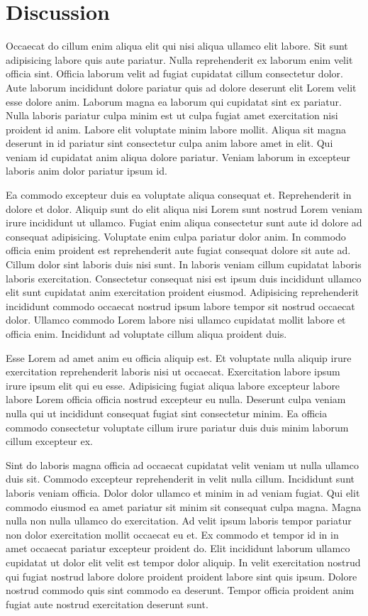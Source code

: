\section{Discussion}
Occaecat do cillum enim aliqua elit qui nisi aliqua ullamco elit labore. Sit sunt adipisicing labore quis aute pariatur. Nulla reprehenderit ex laborum enim velit officia sint. Officia laborum velit ad fugiat cupidatat cillum consectetur dolor. Aute laborum incididunt dolore pariatur quis ad dolore deserunt elit Lorem velit esse dolore anim.
Laborum magna ea laborum qui cupidatat sint ex pariatur. Nulla laboris pariatur culpa minim est ut culpa fugiat amet exercitation nisi proident id anim. Labore elit voluptate minim labore mollit. Aliqua sit magna deserunt in id pariatur sint consectetur culpa anim labore amet in elit. Qui veniam id cupidatat anim aliqua dolore pariatur. Veniam laborum in excepteur laboris anim dolor pariatur ipsum id.

Ea commodo excepteur duis ea voluptate aliqua consequat et. Reprehenderit in dolore et dolor. Aliquip sunt do elit aliqua nisi Lorem sunt nostrud Lorem veniam irure incididunt ut ullamco. Fugiat enim aliqua consectetur sunt aute id dolore ad consequat adipisicing. Voluptate enim culpa pariatur dolor anim. In commodo officia enim proident est reprehenderit aute fugiat consequat dolore sit aute ad.
Cillum dolor sint laboris duis nisi sunt. In laboris veniam cillum cupidatat laboris laboris exercitation. Consectetur consequat nisi est ipsum duis incididunt ullamco elit sunt cupidatat anim exercitation proident eiusmod. Adipisicing reprehenderit incididunt commodo occaecat nostrud ipsum labore tempor sit nostrud occaecat dolor. Ullamco commodo Lorem labore nisi ullamco cupidatat mollit labore et officia enim. Incididunt ad voluptate cillum aliqua proident duis.

Esse Lorem ad amet anim eu officia aliquip est. Et voluptate nulla aliquip irure exercitation reprehenderit laboris nisi ut occaecat. Exercitation labore ipsum irure ipsum elit qui eu esse.
Adipisicing fugiat aliqua labore excepteur labore labore Lorem officia officia nostrud excepteur eu nulla. Deserunt culpa veniam nulla qui ut incididunt consequat fugiat sint consectetur minim. Ea officia commodo consectetur voluptate cillum irure pariatur duis duis minim laborum cillum excepteur ex.

Sint do laboris magna officia ad occaecat cupidatat velit veniam ut nulla ullamco duis sit. Commodo excepteur reprehenderit in velit nulla cillum. Incididunt sunt laboris veniam officia. Dolor dolor ullamco et minim in ad veniam fugiat. Qui elit commodo eiusmod ea amet pariatur sit minim sit consequat culpa magna. Magna nulla non nulla ullamco do exercitation.
Ad velit ipsum laboris tempor pariatur non dolor exercitation mollit occaecat eu et. Ex commodo et tempor id in in amet occaecat pariatur excepteur proident do. Elit incididunt laborum ullamco cupidatat ut dolor elit velit est tempor dolor aliquip. In velit exercitation nostrud qui fugiat nostrud labore dolore proident proident labore sint quis ipsum. Dolore nostrud commodo quis sint commodo ea deserunt. Tempor officia proident anim fugiat aute nostrud exercitation deserunt sunt.

